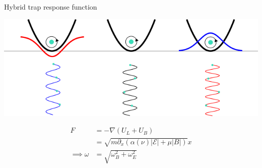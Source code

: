 \documentclass{beamer}
\begin{document}

\begin{frame}{Hybrid trap response function}
    \begin{center}
        \includegraphics[width=\textwidth]{figures/TO/trap_response.png}    
    \end{center}
    

    \begin{align}
        F &= -\nabla(U_{L} + U_{B})\\
            & =\sqrt{m  \partial_{x}\left(\alpha(\nu)|\mathcal{E}|+\mu |B|\right)} x\\
    \implies \omega &= \sqrt{\omega_{B}^2 + \omega_{E}^2}
    \end{align}
\end{frame}





\end{document}
